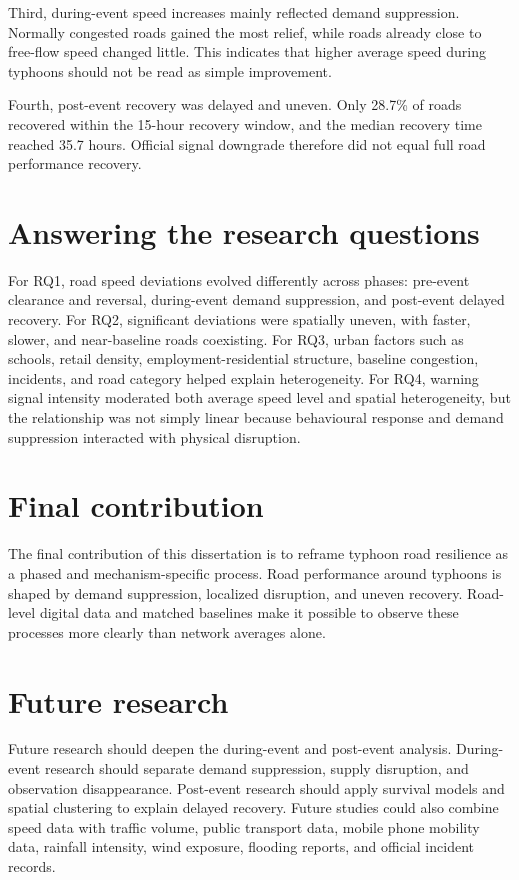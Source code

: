 \documentclass[12pt,a4paper]{report}
\begin{document}
Third, during-event speed increases mainly reflected demand suppression. Normally congested roads gained the most relief, while roads already close to free-flow speed changed little. This indicates that higher average speed during typhoons should not be read as simple improvement.

Fourth, post-event recovery was delayed and uneven. Only 28.7\% of roads recovered within the 15-hour recovery window, and the median recovery time reached 35.7 hours. Official signal downgrade therefore did not equal full road performance recovery.

\section{Answering the research questions}
For RQ1, road speed deviations evolved differently across phases: pre-event clearance and reversal, during-event demand suppression, and post-event delayed recovery. For RQ2, significant deviations were spatially uneven, with faster, slower, and near-baseline roads coexisting. For RQ3, urban factors such as schools, retail density, employment-residential structure, baseline congestion, incidents, and road category helped explain heterogeneity. For RQ4, warning signal intensity moderated both average speed level and spatial heterogeneity, but the relationship was not simply linear because behavioural response and demand suppression interacted with physical disruption.

\section{Final contribution}
The final contribution of this dissertation is to reframe typhoon road resilience as a phased and mechanism-specific process. Road performance around typhoons is shaped by demand suppression, localized disruption, and uneven recovery. Road-level digital data and matched baselines make it possible to observe these processes more clearly than network averages alone.

\section{Future research}
Future research should deepen the during-event and post-event analysis. During-event research should separate demand suppression, supply disruption, and observation disappearance. Post-event research should apply survival models and spatial clustering to explain delayed recovery. Future studies could also combine speed data with traffic volume, public transport data, mobile phone mobility data, rainfall intensity, wind exposure, flooding reports, and official incident records.
\end{document}
